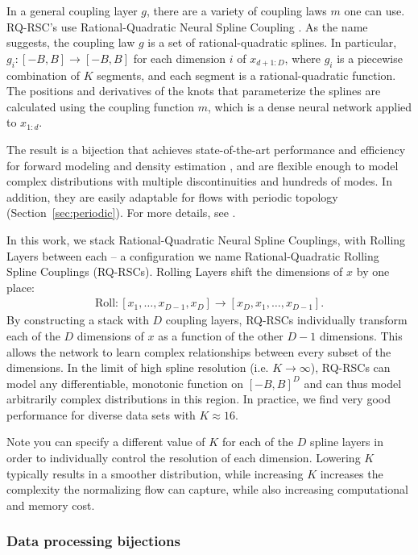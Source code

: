 \documentclass[twocolumn,twocolappendix]{aastex631}
\begin{document}
In a general coupling layer $g$, there are a variety of coupling laws $m$ one can use.
RQ-RSC's use Rational-Quadratic Neural Spline Coupling \citep{durkan2019}.
As the name  suggests, the coupling law $g$ is a set of rational-quadratic splines.
In particular, $g_i: [-B, B] \to [-B, B]$ for each dimension $i$ of $x_{d+1:D}$, where $g_i$ is a piecewise combination of $K$ segments, and each segment is a rational-quadratic function.
The positions and derivatives of the knots that parameterize the splines are calculated using the coupling function $m$, which is a dense neural network applied to $x_{1:d}$.

The result is a bijection that achieves state-of-the-art performance and efficiency for forward modeling and density estimation \citep{kobyzev2020}, and are flexible enough to model complex distributions with multiple discontinuities and hundreds of modes.
In addition, they are easily adaptable for flows with periodic topology (Section~\ref{sec:periodic}).
For more details, see \citet{durkan2019}.

In this work, we stack Rational-Quadratic Neural Spline Couplings, with Rolling Layers between each -- a configuration we name Rational-Quadratic Rolling Spline Couplings (RQ-RSCs).
Rolling Layers shift the dimensions of $x$ by one place:
\begin{align}
    \mathrm{Roll}: [x_1, \dots , x_{D-1}, x_D] \to [x_D, x_1, \dots , x_{D-1}].
\end{align}
By constructing a stack with $D$ coupling layers, RQ-RSCs individually transform each of the $D$ dimensions of $x$ as a function of the other $D-1$ dimensions.
This allows the network to learn complex relationships between every subset of the dimensions.
In the limit of high spline resolution (i.e. $K \to \infty$), RQ-RSCs can model any differentiable, monotonic function on $[-B, B]^D$ and can thus model arbitrarily complex distributions in this region.
In practice, we find very good performance for diverse data sets with $K \approx 16$.

Note you can specify a different value of $K$ for each of the $D$ spline layers in order to individually control the resolution of each dimension.
Lowering $K$ typically results in a smoother distribution, while increasing $K$ increases the complexity the normalizing flow can capture, while also increasing computational and memory cost.

\subsubsection{Data processing bijections}
\label{sec:data-processing}
\end{document}
